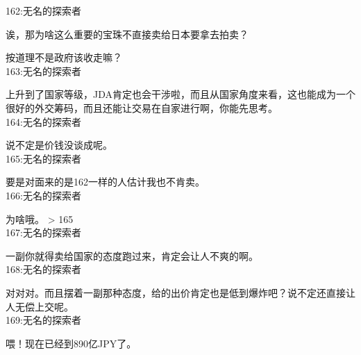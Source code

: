 162:无名的探索者

诶，那为啥这么重要的宝珠不直接卖给日本要拿去拍卖？

按道理不是政府该收走嘛？\\

163:无名的探索者

上升到了国家等级，JDA肯定也会干涉啦，而且从国家角度来看，这也能成为一个很好的外交筹码，而且还能让交易在自家进行啊，你能先思考。\\

164:无名的探索者

说不定是价钱没谈成呢。\\

165:无名的探索者

要是对面来的是162一样的人估计我也不肯卖。\\

166:无名的探索者

为啥哦。 > 165\\

167:无名的探索者

一副你就得卖给国家的态度跑过来，肯定会让人不爽的啊。\\

168:无名的探索者

对对对。而且摆着一副那种态度，给的出价肯定也是低到爆炸吧？说不定还直接让人无偿上交呢。\\

169:无名的探索者

喂！现在已经到890亿JPY了。\\

